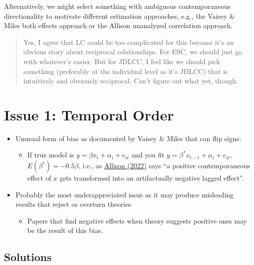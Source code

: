 \documentclass[
  letterpaper,
  DIV=11,
  numbers=noendperiod]{scrartcl}
\providecommand{\tightlist}{%
  \setlength{\itemsep}{0pt}\setlength{\parskip}{0pt}}\usepackage{longtable,booktabs,array}
\begin{document}
Alternatively, we might select something with ambiguous contemporaneous
directionality to motivate different estimation approaches, e.g., the
Vaisey \& Miles both effects approach or the Allison unanalyzed
correlation approach.

\begin{quote}
Yes, I agree that LC could be too complicated for this because it's an
obvious story about reciprocal relationships. For ESC, we should just go
with whatever's easier. But for JDLCC, I feel like we should pick
something (preferably at the individual level as it's JDLCC) that is
intuitively and obviously reciprocal. Can't figure out what yet, though.
\end{quote}

\section{Issue 1: Temporal Order}\label{issue-1-temporal-order}

\begin{itemize}
\tightlist
\item
  Unusual form of bias as documented by Vaisey \& Miles that can flip
  signs:

  \begin{itemize}
  \tightlist
  \item
    If true model is \(y = \beta x_t + \alpha_i + e_{it}\) and you fit
    \(y = \beta^* x_{t-t} + \alpha_i + e_{it}\),
    \(E(\beta^*) = -0.5\beta\), i.e., as
    \href{https://statisticalhorizons.com/getting-the-lags-right-a-new-solution/}{Allison
    (2022)} says ``a positive contemporaneous effect of \(x\) gets
    transformed into an artifactually negative lagged effect''.
  \end{itemize}
\item
  Probably the most underappreciated issue as it may produce misleading
  results that reject or overturn theories

  \begin{itemize}
  \tightlist
  \item
    Papers that find negative effects when theory suggests positive ones
    may be the result of this bias.
  \end{itemize}
\end{itemize}

\subsection{Solutions}\label{solutions}
\end{document}
